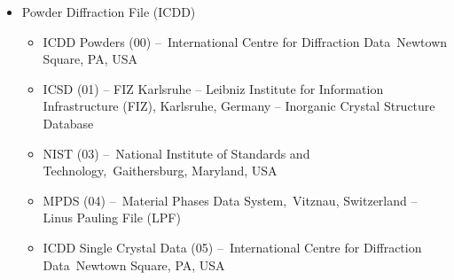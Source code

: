 


\begin{itemize}
\item Powder Diffraction File (ICDD)
\begin{itemize}
    \item ICDD Powders (00) – International Centre for Diffraction Data Newtown Square, PA, USA
    \item ICSD (01) – FIZ Karlsruhe – Leibniz Institute for Information Infrastructure (FIZ), Karlsruhe, Germany – Inorganic Crystal Structure Database
    \item NIST (03) – National Institute of Standards and Technology, Gaithersburg, Maryland, USA
    \item MPDS (04) – Material Phases Data System, Vitznau, Switzerland – Linus Pauling File (LPF)
    \item ICDD Single Crystal Data (05) – International Centre for Diffraction Data Newtown Square, PA, USA
\end{itemize}
\end{itemize}
 
